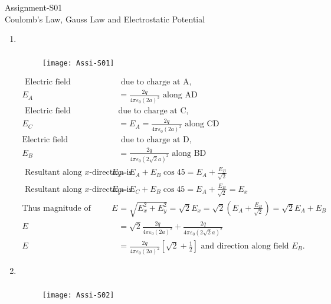\begin{abox}
	Assignment-S01\\
	\vspace{0.5cm}
	 Coulomb's Law, Gauss Law and Electrostatic Potential
	\end{abox}
\begin{enumerate}
	\item $\left. \right. $
	\begin{answer}$\left. \right. $
		\begin{figure}[H]
			\centering
			\texttt{[image: Assi-S01]}
		\end{figure}
		\begin{align*}
		\text{ Electric field}&\text{ due to charge at A,}\\
		E_{A}&=\frac{2 q}{4 \pi \varepsilon_{0}(2 a)^{2}} \text { along } \mathrm{AD}\\
	\text{	Electric field }&\text{due to charge at $\mathrm{C}$,}\\
		E_{C}&=E_{A}=\frac{2 q}{4 \pi \varepsilon_{0}(2 a)^{2}} \text { along } \mathrm{CD}\\
		\text{Electric field}&\text{ due to charge at D,}\\
		E_{B}&=\frac{2 q}{4 \pi \varepsilon_{0}(2 \sqrt{2} a)^{2}} \text { along BD }\\
	\text{	Resultant along $x$-direction is }E_{x}&=E_{A}+E_{B} \cos 45=E_{A}+\frac{E_{B}}{\sqrt{2}}\\
	\text{	Resultant along $x$-direction is }E_{y}&=E_{C}+E_{B} \cos 45=E_{A}+\frac{E_{B}}{\sqrt{2}}=E_{x}\\
		\text{Thus magnitude of resultant field is }E&=\sqrt{E_{x}^{2}+E_{y}^{2}}=\sqrt{2} E_{x}=\sqrt{2}\left(E_{A}+\frac{E_{B}}{\sqrt{2}}\right)=\sqrt{2} E_{A}+E_{B}\\
		E&=\sqrt{2} \frac{2 q}{4 \pi \varepsilon_{0}(2 a)^{2}}+\frac{2 q}{4 \pi \varepsilon_{0}(2 \sqrt{2} a)^{2}}\\
		E&=\frac{2 q}{4 \pi \varepsilon_{0}(2 a)^{2}}\left[\sqrt{2}+\frac{1}{2}\right]\text{ and direction along field }E_{B} .
		\end{align*}
	\end{answer}
\item $\left. \right. $
\begin{answer}$\left. \right. $
		\begin{figure}[H]
		\centering
		\texttt{[image: Assi-S02]}
	\end{figure}
	\begin{align*}

\end{align*}
\end{answer}
\end{enumerate}
